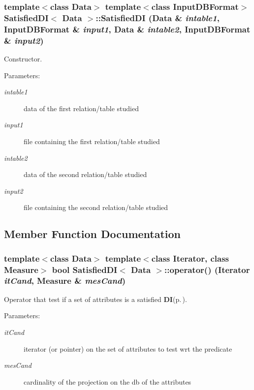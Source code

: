 \subsubsection{\setlength{\rightskip}{0pt plus 5cm}template$<$class Data$>$ template$<$class Input\-DBFormat$>$ {\bf Satisfied\-DI}$<$ Data $>$::{\bf Satisfied\-DI} (Data \& {\em intable1}, Input\-DBFormat \& {\em input1}, Data \& {\em intable2}, Input\-DBFormat \& {\em input2})\hspace{0.3cm}{\tt  [inline]}}\label{class_satisfied_d_i_484f8471fa06bd7b1595228a39713776}


Constructor. 

\begin{Desc}
\item[Parameters:]
\begin{description}
\item[{\em intable1}]data of the first relation/table studied \item[{\em input1}]file containing the first relation/table studied \item[{\em intable2}]data of the second relation/table studied \item[{\em input2}]file containing the second relation/table studied \end{description}
\end{Desc}


\subsection{Member Function Documentation}
\subsubsection{\setlength{\rightskip}{0pt plus 5cm}template$<$class Data$>$ template$<$class Iterator, class Measure$>$ bool {\bf Satisfied\-DI}$<$ Data $>$::operator() (Iterator {\em it\-Cand}, Measure \& {\em mes\-Cand})}\label{class_satisfied_d_i_834a0bf18d8fe074f5db2b78d8039264}


Operator that test if a set of attributes is a satisfied {\bf DI}{\rm (p.\,\pageref{class_d_i})}. 

\begin{Desc}
\item[Parameters:]
\begin{description}
\item[{\em it\-Cand}]iterator (or pointer) on the set of attributes to test wrt the predicate \item[{\em mes\-Cand}]cardinality of the projection on the db of the attributes \end{description}
\end{Desc}


